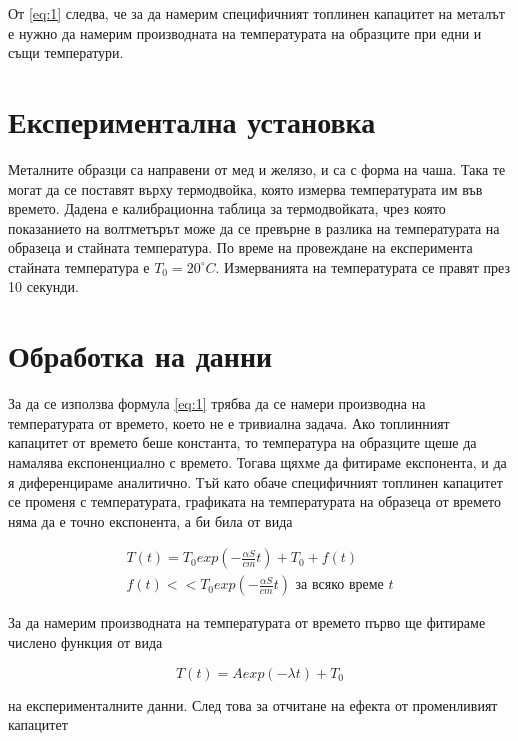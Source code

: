 \documentclass[
 reprint,
 amsmath,amssymb,
 aps,
]{revtex4-2}
\newcommand{\degree}{^{\circ}}
\begin{document}
От \eqref{eq:1} следва, че за да намерим специфичният топлинен капацитет на металът е нужно да намерим производната на температурата на образците при едни и същи температури. 

\section{Експериментална установка}

Металните образци са направени от мед и желязо, и са с форма на чаша. Така те могат да се поставят върху термодвойка, която измерва температурата им във времето. Дадена е калибрационна таблица за термодвойката, чрез която показанието на волтметърът може да се превърне в разлика на температурата на образеца и стайната температура. По време на провеждане на експеримента стайната температура е $T_0 = 20\degree C$. Измерванията на температурата се правят през 10 секунди. 

\section{Обработка на данни}

За да се използва формула \eqref{eq:1} трябва да се намери производна на температурата от времето, което не е тривиална задача. Ако топлинният капацитет от времето беше константа, то температура на образците щеше да намалява експоненциално с времето. Тогава щяхме да фитираме експонента, и да я диференцираме аналитично. Тъй като обаче специфичният топлинен капацитет се променя с температурата, графиката на температурата на образеца от времето няма да е точно експонента, а би била от вида

\begin{gather*}
    T(t) = T_0 exp(-\frac{\alpha S}{cm}t) + T_0 + f(t) \\
    f(t) << T_0 exp(-\frac{\alpha S}{cm}t) \text{ за всяко време } t
\end{gather*}

За да намерим производната на температурата от времето първо ще фитираме числено функция от вида 

\begin{equation*}
    T(t) = A exp(-\lambda t) + T_0
\end{equation*}

на експерименталните данни. След това за отчитане на ефекта от променливият капацитет
\end{document}
